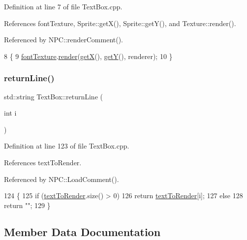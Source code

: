 Definition at line 7 of file Text\+Box.\+cpp.



References font\+Texture, Sprite\+::get\+X(), Sprite\+::get\+Y(), and Texture\+::render().



Referenced by N\+P\+C\+::render\+Comment().


\begin{DoxyCode}
8 \{
9     \hyperlink{class_text_box_a94e1863fccbb2e8de3547aa89b8e85f0}{fontTexture}.\hyperlink{class_texture_ac91a5257c451c80ffbf9a3d1485ba1c8}{render}(\hyperlink{class_sprite_a03d6c82bddfd3d164ce8997482c57c85}{getX}(), \hyperlink{class_sprite_a53ea8b27bcd0dab0627a2dceab2b9d98}{getY}(), renderer);
10 \}
\end{DoxyCode}
\mbox{\label{class_text_box_ac10a24236f968ae36705f8bf300dfd79}} 
\subsubsection{\texorpdfstring{return\+Line()}{returnLine()}}
{\footnotesize\ttfamily std\+::string Text\+Box\+::return\+Line (\begin{DoxyParamCaption}\item[{int}]{i }\end{DoxyParamCaption})}



Definition at line 123 of file Text\+Box.\+cpp.



References text\+To\+Render.



Referenced by N\+P\+C\+::\+Load\+Comment().


\begin{DoxyCode}
124 \{
125     \textcolor{keywordflow}{if} (\hyperlink{class_text_box_a13ec32aabf23db2253af70f19a2bf1e9}{textToRender}.size() > 0)
126         \textcolor{keywordflow}{return} \hyperlink{class_text_box_a13ec32aabf23db2253af70f19a2bf1e9}{textToRender}[i];
127     \textcolor{keywordflow}{else}
128         \textcolor{keywordflow}{return} \textcolor{stringliteral}{""};
129 \}
\end{DoxyCode}


\subsection{Member Data Documentation}
\mbox{\label{class_text_box_a55689185cc0627e45b0d70304eb962d2}} 
